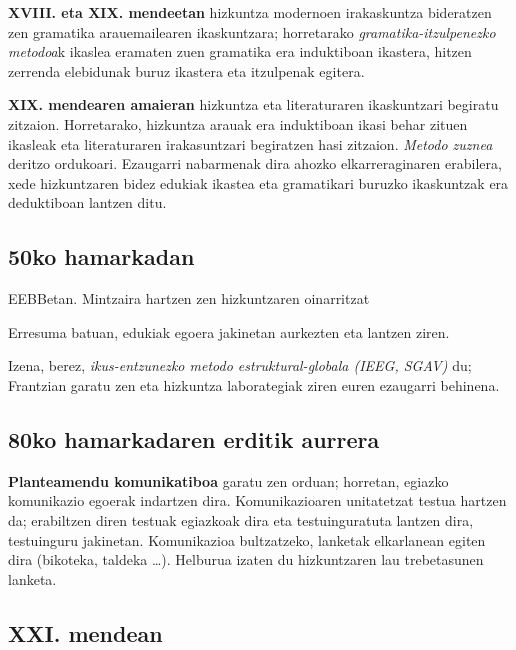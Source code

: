 \documentclass[]{book}
\providecommand{\tightlist}{%
  \setlength{\itemsep}{0pt}\setlength{\parskip}{0pt}}
\begin{document}
\textbf{XVIII. eta XIX. mendeetan} hizkuntza modernoen irakaskuntza bideratzen zen gramatika arauemailearen ikaskuntzara; horretarako \emph{gramatika-itzulpenezko metodoa}k ikaslea eramaten zuen gramatika era induktiboan ikastera, hitzen zerrenda elebidunak buruz ikastera eta itzulpenak egitera.

\textbf{XIX. mendearen amaieran} hizkuntza eta literaturaren ikaskuntzari begiratu zitzaion. Horretarako, hizkuntza arauak era induktiboan ikasi behar zituen ikasleak eta literaturaren irakasuntzari begiratzen hasi zitzaion. \emph{Metodo zuznea} deritzo ordukoari. Ezaugarri nabarmenak dira ahozko elkarreraginaren erabilera, xede hizkuntzaren bidez edukiak ikastea eta gramatikari buruzko ikaskuntzak era deduktiboan lantzen ditu.

\hypertarget{ko-hamarkadan}{%
\subsection{50ko hamarkadan}\label{ko-hamarkadan}}

\begin{description}
\tightlist
\item[Metodo audiolinguala]
EEBBetan. Mintzaira hartzen zen hizkuntzaren oinarritzat
\item[Metodo situazionala]
Erresuma batuan, edukiak egoera jakinetan aurkezten eta lantzen ziren.
\item[Metodo estruktural-globala]
Izena, berez, \emph{ikus-entzunezko metodo estruktural-globala (IEEG, SGAV)} du; Frantzian garatu zen eta hizkuntza laborategiak ziren euren ezaugarri behinena.
\end{description}

\hypertarget{ko-hamarkadaren-erditik-aurrera}{%
\subsection{80ko hamarkadaren erditik aurrera}\label{ko-hamarkadaren-erditik-aurrera}}

\textbf{Planteamendu komunikatiboa} garatu zen orduan; horretan, egiazko komunikazio egoerak indartzen dira. Komunikazioaren unitatetzat testua hartzen da; erabiltzen diren testuak egiazkoak dira eta testuinguratuta lantzen dira, testuinguru jakinetan. Komunikazioa bultzatzeko, lanketak elkarlanean egiten dira (bikoteka, taldeka \ldots{}). Helburua izaten du hizkuntzaren lau trebetasunen lanketa.

\hypertarget{xxi.-mendean}{%
\subsection{XXI. mendean}\label{xxi.-mendean}}
\end{document}
